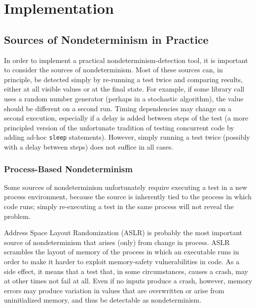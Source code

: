 \section{Implementation}


\subsection{Sources of Nondeterminism in Practice}

In order to implement a practical nondeterminism-detection tool, it is
important to consider the sources of nondeterminism.  Most of these
sources can, in principle, be detected simply by re-running a test
twice and comparing results, either at all visible values or at the
final state.  For example, if some library call uses a random number
generator (perhaps in a stochastic algorithm), the value should be
different on a second run.  Timing dependencies may change on a second
execution, especially if a delay is added between steps of the test (a
more principled version of the unfortunate tradition of testing
concurrent code by adding ad-hoc {\tt sleep} statements).  However,
simply running a test twice (possibly with a delay between steps) does
not suffice in all cases.

\subsubsection{Process-Based Nondeterminism}

\label{sec:pnondet}

Some sources of nondeterminism unfortunately require executing a test in a new
process environment, because the source is inherently tied to the
process in which code runs; simply re-executing a test in the same
process will not reveal the problem.

Address Space Layout Randomization (ASLR) \cite{ASLR}  is probably the most
important source of nondeterminism that arises (only) from change in
process.  ASLR scrambles the layout of memory of the process in which
an executable runs in order to make it harder to exploit memory-safety
vulnerabilities in code.  As a side effect, it
means that a test that, in some circumstances, causes a crash, may at
other times not fail at all.  Even if no inputs produce a crash,
however, memory errors may produce variation in values that are
overwritten or arise from uninitialized memory, and thus be detectable
as nondeterminism.

